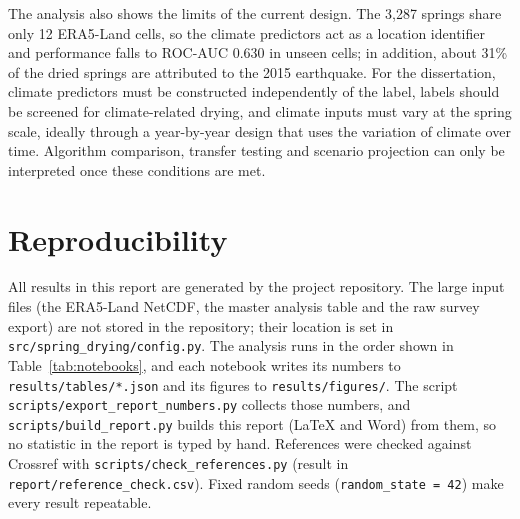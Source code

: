 \documentclass[12pt,a4paper]{article}
\begin{document}
The analysis also shows the limits of the current design. The 3,287 springs share only 12 ERA5-Land cells, so the climate predictors act as a location identifier and performance falls to ROC-AUC 0.630 in unseen cells; in addition, about 31\% of the dried springs are attributed to the 2015 earthquake. For the dissertation, climate predictors must be constructed independently of the label, labels should be screened for climate-related drying, and climate inputs must vary at the spring scale, ideally through a year-by-year design that uses the variation of climate over time. Algorithm comparison, transfer testing and scenario projection can only be interpreted once these conditions are met.

\clearpage
{}
{}



\clearpage
\appendix

\clearpage
\section{Reproducibility}\label{sec:appendix-repro}

All results in this report are generated by the project repository. The large input files (the ERA5-Land NetCDF, the master analysis table and the raw survey export) are not stored in the repository; their location is set in \texttt{src/spring\_\allowbreak{}drying/config.py}. The analysis runs in the order shown in Table~\ref{tab:notebooks}, and each notebook writes its numbers to \texttt{results/tables/*.json} and its figures to \texttt{results/figures/}. The script \texttt{scripts/export\_\allowbreak{}report\_\allowbreak{}numbers.py} collects those numbers, and \texttt{scripts/build\_\allowbreak{}report.py} builds this report (LaTeX and Word) from them, so no statistic in the report is typed by hand. References were checked against Crossref with \texttt{scripts/check\_\allowbreak{}references.py} (result in \texttt{report/reference\_\allowbreak{}check.csv}). Fixed random seeds (\texttt{random\_\allowbreak{}state = 42}) make every result repeatable.
\end{document}
